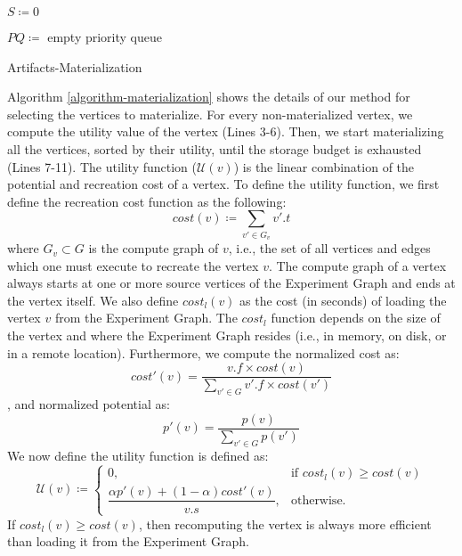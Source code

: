 \begin{algorithm}[h]
$S \coloneqq 0$

$PQ \coloneqq $ empty priority queue\;

\caption{Artifacts-Materialization}\label{algorithm-materialization}
\end{algorithm}

Algorithm \ref{algorithm-materialization} shows the details of our method for selecting the vertices to materialize.
For every non-materialized vertex, we compute the utility value of the vertex (Lines 3-6).
Then, we start materializing all the vertices, sorted by their utility, until the storage budget is exhausted (Lines 7-11).
The utility function ($\mathcal{U}(v) $) is the linear combination of the potential and recreation cost of a vertex.
To define the utility function, we first define the recreation cost function as the following:  
\[
cost(v) \coloneqq \sum\limits_{v' \in G_v} v'.t
\]
where $G_v \subset G$ is the compute graph of $v$, i.e., the set of all vertices and edges which one must execute to recreate the vertex $v$.
The compute graph of a vertex always starts at one or more source vertices of the Experiment Graph and ends at the vertex itself.
We also define $cost_l(v)$ as the cost (in seconds) of  loading the vertex $v$ from the Experiment Graph. 
The $cost_l$ function depends on the size of the vertex and where the Experiment Graph resides (i.e., in memory, on disk, or in a remote location).
Furthermore, we compute the normalized cost as:
\[cost'(v) = \dfrac{v.f  \times cost(v) }{\sum\limits_{v' \in G} v'.f \times cost(v')}\],
and normalized potential as:
\[p'(v) = \dfrac{p(v) }{\sum\limits_{v' \in G} p(v')}\]
We now define the utility function is defined as: 
\[
\mathcal{U}(v) \coloneqq  	
		\begin{cases}
		0, & \text{if }  cost_l(v) \ge cost(v)  \\ 
		\dfrac{\alpha p'(v) + (1-\alpha)cost'(v)}{v.s}, & \text{otherwise}.
		\end{cases}
\]
If $cost_l(v) \ge cost(v)$, then recomputing the vertex is always more efficient than loading it from the Experiment Graph.
